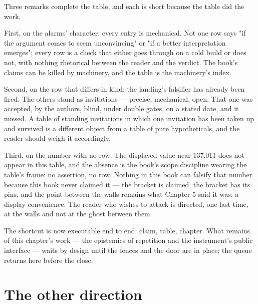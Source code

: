 Three remarks complete the table, and each is short because the table did the work.

First, on the alarms' character: every entry is mechanical. Not one row says "if
the argument comes to seem unconvincing" or "if a better interpretation emerges";
every row is a check that either goes through on a cold build or does not, with
nothing rhetorical between the reader and the verdict. The book's claims can be
killed by machinery, and the table is the machinery's index.

Second, on the row that differs in kind: the landing's falsifier has already been
fired. The others stand as invitations --- precise, mechanical, open. That one was
accepted, by the authors, blind, under double gates, on a stated date, and it
missed. A table of standing invitations in which one invitation has been taken up
and survived is a different object from a table of pure hypotheticals, and the
reader should weigh it accordingly.

Third, on the number with no row. The displayed value near 137.011 does not appear
in this table, and the absence is the book's scope discipline wearing the table's
frame: no assertion, no row. Nothing in this book can falsify that number because
this book never claimed it --- the bracket is claimed, the bracket has its pins,
and the point between the walls remains what Chapter 5 said it was: a display
convenience. The reader who wishes to attack is directed, one last time, at the
walls and not at the ghost between them.

The shortcut is now executable end to end: claim, table, chapter. What remains of
this chapter's work --- the epistemics of repetition and the instrument's public
interface --- waits by design until the fences and the door are in place; the
queue returns here before the close.

\section{The other direction}

